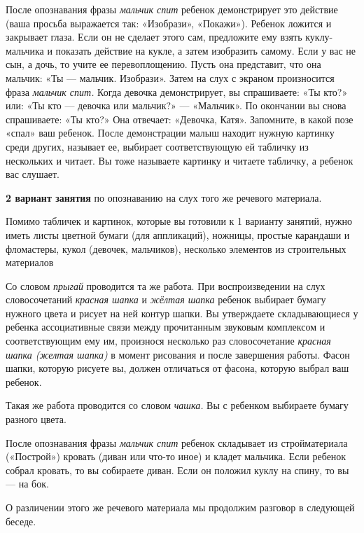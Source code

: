 \documentclass{book}
\renewcommand{\emph}[1]{\textit{#1}}
\begin{document}
После опознавания фразы \emph{мальчик спит} ребенок демонстрирует это
действие (ваша просьба выражается так: «Изобрази», «Покажи»). Ребенок
ложится и закрывает глаза. Если он не сделает этого сам, предложите ему
взять куклу-мальчика и показать действие на кукле, а затем изобразить
самому. Если у вас не сын, а дочь, то учите ее перевоплощению. Пусть она
представит, что она мальчик: «Ты --- мальчик. Изобрази». Затем на слух с
экраном произносится фраза \emph{мальчик спит.} Когда девочка
демонстрирует, вы спрашиваете: «Ты кто?» или: «Ты кто --- девочка или
мальчик?» --- «Мальчик». По окончании вы снова спрашиваете: «Ты кто?»
Она отвечает: «Девочка, Катя». Запомните, в какой позе «спал» ваш
ребенок. После демонстрации малыш находит нужную картинку среди других,
называет ее, выбирает соответствующую ей табличку из нескольких и
читает. Вы тоже называете картинку и читаете табличку, а ребенок вас
слушает.

\textbf{2 вариант занятия} по опознаванию на слух того же речевого
материала.

Помимо табличек и картинок, которые вы готовили к 1 варианту занятий,
нужно иметь листы цветной бумаги (для аппликаций), ножницы, простые
карандаши и фломастеры, кукол (девочек, мальчиков), несколько элементов
из строительных материалов

Со словом \emph{прыгай} проводится та же работа. При воспроизведении на
слух словосочетаний \emph{красная шапка} и \emph{жёлтая шапка} ребенок
выбирает бумагу нужного цвета и рисует на ней контур шапки. Вы
утверждаете складывающиеся у ребенка ассоциативные связи между
прочитанным звуковым комплексом и соответствующим ему им, произнося
несколько раз словосочетание \emph{красная шапка (желтая шапка)} в
момент рисования и после завершения работы. Фасон шапки, которую рисуете
вы, должен отличаться от фасона, которую выбрал ваш ребенок.

Такая же работа проводится со словом \emph{чашка.} Вы с ребенком
выбираете бумагу разного цвета.

После опознавания фразы \emph{мальчик спит} ребенок складывает из
стройматериала («Построй») кровать (диван или что-то иное) и кладет
мальчика. Если ребенок собрал кровать, то вы собираете диван. Если он
положил куклу на спину, то вы --- на бок.

О различении этого же речевого материала мы продолжим разговор в
следующей беседе.
\end{document}
